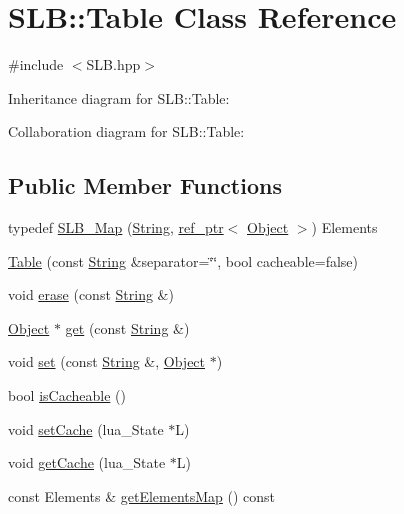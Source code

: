 \hypertarget{classSLB_1_1Table}{}\section{S\+LB\+:\+:Table Class Reference}
\label{classSLB_1_1Table}


{\ttfamily \#include $<$S\+L\+B.\+hpp$>$}



Inheritance diagram for S\+LB\+:\+:Table\+:


Collaboration diagram for S\+LB\+:\+:Table\+:
\subsection*{Public Member Functions}
\begin{DoxyCompactItemize}
\item 
typedef \hyperlink{classSLB_1_1Table_a81b3d3919cab27164c174b20b2e08159}{S\+L\+B\+\_\+\+Map} (\hyperlink{namespaceSLB_a6a4c36e7004d99c0535c2c91c200c9a1}{String}, \hyperlink{classSLB_1_1ref__ptr}{ref\+\_\+ptr}$<$ \hyperlink{classSLB_1_1Object}{Object} $>$) Elements
\item 
\hyperlink{classSLB_1_1Table_a9432294b70728c1bef84102a008cc7a8}{Table} (const \hyperlink{namespaceSLB_a6a4c36e7004d99c0535c2c91c200c9a1}{String} \&separator=\char`\"{}\char`\"{}, bool cacheable=false)
\item 
void \hyperlink{classSLB_1_1Table_ab97726256ebec72474bd211bd4eca48d}{erase} (const \hyperlink{namespaceSLB_a6a4c36e7004d99c0535c2c91c200c9a1}{String} \&)
\item 
\hyperlink{classSLB_1_1Object}{Object} $\ast$ \hyperlink{classSLB_1_1Table_af39d798ee42d25a67131463b8a0be8f9}{get} (const \hyperlink{namespaceSLB_a6a4c36e7004d99c0535c2c91c200c9a1}{String} \&)
\item 
void \hyperlink{classSLB_1_1Table_a4cb5196754409280090ae7a833da75ff}{set} (const \hyperlink{namespaceSLB_a6a4c36e7004d99c0535c2c91c200c9a1}{String} \&, \hyperlink{classSLB_1_1Object}{Object} $\ast$)
\item 
bool \hyperlink{classSLB_1_1Table_ad9c7d43d059da99cadfe7e25a9920666}{is\+Cacheable} ()
\item 
void \hyperlink{classSLB_1_1Table_a698055e7e62b57b4b327186505ed719c}{set\+Cache} (lua\+\_\+\+State $\ast$L)
\item 
void \hyperlink{classSLB_1_1Table_a1760fb5d87dfd381b898693eafd7a64a}{get\+Cache} (lua\+\_\+\+State $\ast$L)
\item 
const Elements \& \hyperlink{classSLB_1_1Table_ab07c93171d636a89f81080fd24b0abbe}{get\+Elements\+Map} () const 
\end{DoxyCompactItemize}
